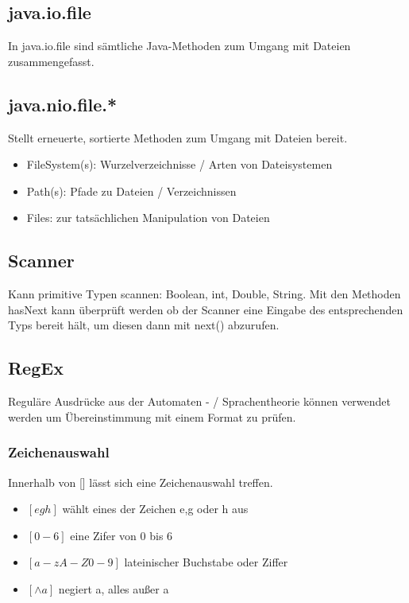 \documentclass[12pt,a4]{article}
\begin{document}
\subsection{java.io.file}
In java.io.file sind sämtliche Java-Methoden zum Umgang mit Dateien zusammengefasst.
\subsection{java.nio.file.*}
Stellt erneuerte, sortierte Methoden zum Umgang mit Dateien bereit.
\begin{itemize}
	\item FileSystem(s): Wurzelverzeichnisse / Arten von Dateisystemen
	\item Path(s): Pfade zu Dateien / Verzeichnissen
	\item Files: zur tatsächlichen Manipulation von Dateien
\end{itemize}
\subsection{Scanner}
Kann primitive Typen scannen: Boolean, int, Double, String.
Mit den Methoden hasNext kann überprüft werden ob der Scanner eine Eingabe des entsprechenden Typs bereit hält, um diesen dann mit next()  abzurufen.
\subsection{RegEx}
Reguläre Ausdrücke aus der Automaten - / Sprachentheorie können verwendet werden um Übereinstimmung mit einem Format zu prüfen.
 \subsubsection{Zeichenauswahl}
 Innerhalb von [] lässt sich eine Zeichenauswahl treffen.
 \begin{itemize}
 	\item \(\left[egh\right]\) wählt eines der Zeichen e,g oder h aus
 	\item \(\left[0-6\right]\) eine Zifer von 0 bis 6
 	\item \(\left[a-zA-Z0-9\right]\) lateinischer Buchstabe oder Ziffer
 	\item \(\left[\wedge a\right]\) negiert a, alles außer a
 \end{itemize}
 
\end{document}
